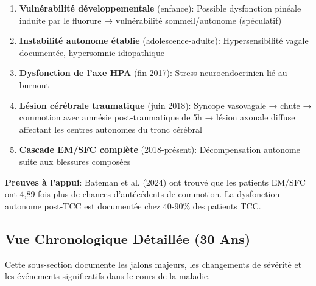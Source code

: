 \begin{enumerate}
\item \textbf{Vulnérabilité développementale} (enfance): Possible dysfonction pinéale induite par le fluorure → vulnérabilité sommeil/autonome (spéculatif)
\item \textbf{Instabilité autonome établie} (adolescence-adulte): Hypersensibilité vagale documentée, hypersomnie idiopathique
\item \textbf{Dysfonction de l'axe HPA} (fin 2017): Stress neuroendocrinien lié au burnout
\item \textbf{Lésion cérébrale traumatique} (juin 2018): Syncope vasovagale → chute → commotion avec amnésie post-traumatique de 5h → lésion axonale diffuse affectant les centres autonomes du tronc cérébral
\item \textbf{Cascade EM/SFC complète} (2018-présent): Décompensation autonome suite aux blessures composées
\end{enumerate}

\textbf{Preuves à l'appui}: Bateman et al. (2024) ont trouvé que les patients EM/SFC ont 4,89 fois plus de chances d'antécédents de commotion. La dysfonction autonome post-TCC est documentée chez 40-90\% des patients TCC.

\subsection{Vue Chronologique Détaillée (30 Ans)}

Cette sous-section documente les jalons majeurs, les changements de sévérité et les événements significatifs dans le cours de la maladie.

